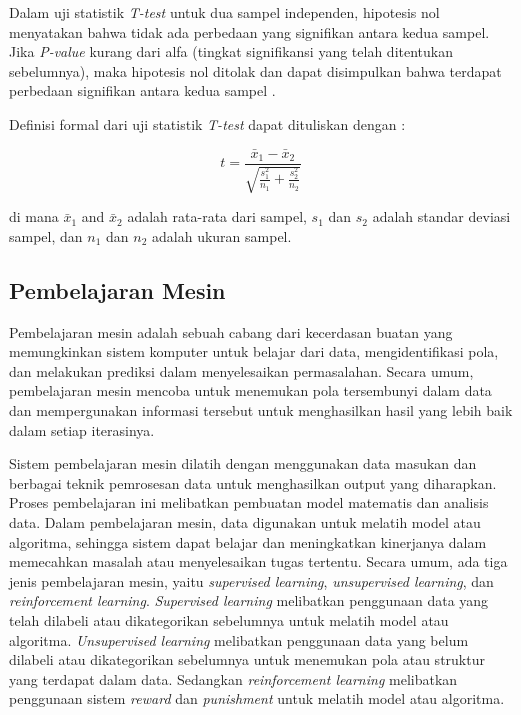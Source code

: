 Dalam uji statistik \emph{T-test} untuk dua sampel independen, hipotesis nol menyatakan bahwa tidak ada perbedaan yang signifikan antara kedua sampel. Jika
\emph{P-value} kurang dari alfa (tingkat signifikansi yang telah ditentukan sebelumnya), maka hipotesis nol ditolak dan dapat disimpulkan bahwa terdapat
perbedaan signifikan antara kedua sampel \cite{kumar}. 

\noindent Definisi formal dari uji statistik \emph{T-test} dapat dituliskan dengan \cite{kumar}:

\begin{equation}
	t = \frac{\bar{x}_1 - \bar{x}_2}{\sqrt{\frac{s_1^2}{n_1} + \frac{s_2^2}{n_2}}}
\end{equation}

di mana $\bar{x}_1$ and $\bar{x}_2$ adalah rata-rata dari sampel, $s_1$ dan $s_2$ adalah standar deviasi sampel, dan $n_1$ dan $n_2$ adalah ukuran sampel.

\subsection{Pembelajaran Mesin}
Pembelajaran mesin adalah sebuah cabang dari kecerdasan buatan yang memungkinkan sistem komputer untuk belajar dari data, mengidentifikasi pola, dan melakukan
prediksi dalam menyelesaikan permasalahan. Secara umum, pembelajaran mesin mencoba untuk menemukan pola tersembunyi dalam data dan mempergunakan informasi
tersebut untuk menghasilkan hasil yang lebih baik dalam setiap iterasinya.

Sistem pembelajaran mesin dilatih dengan menggunakan data masukan dan berbagai teknik pemrosesan data untuk menghasilkan output yang diharapkan. Proses
pembelajaran ini melibatkan pembuatan model matematis dan analisis data. Dalam pembelajaran mesin, data digunakan untuk melatih model atau algoritma, sehingga
sistem dapat belajar dan meningkatkan kinerjanya dalam memecahkan masalah atau menyelesaikan tugas tertentu. Secara umum, ada tiga jenis pembelajaran mesin,
yaitu \emph{supervised learning}, \emph{unsupervised learning}, dan \emph{reinforcement learning}. \emph{Supervised learning} melibatkan penggunaan data yang
telah dilabeli atau dikategorikan sebelumnya untuk melatih model atau algoritma. \emph{Unsupervised learning} melibatkan penggunaan data yang belum dilabeli
atau dikategorikan sebelumnya untuk menemukan pola atau struktur yang terdapat dalam data. Sedangkan \emph{reinforcement learning} melibatkan penggunaan sistem
\emph{reward} dan \emph{punishment} untuk melatih model atau algoritma.

